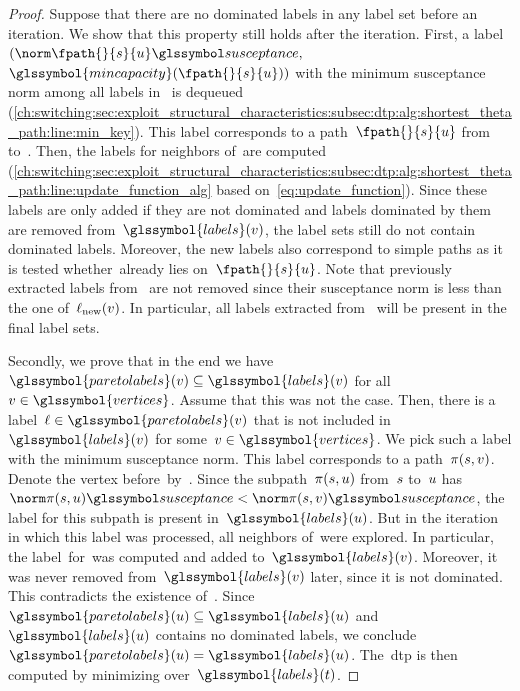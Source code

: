 \begin{proof}
    Suppose that there are no dominated labels in any label set before an iteration.
    We show that this property still holds after the iteration.
    First, a label~$(\bnorm{\fpath{}{\source}{\vertexa}},$ 
    $\glssymbol{mincapacity}(\fpath{}{\source}{\vertexa}))$ with the 
    minimum susceptance norm among all labels in~ is
    dequeued (\cref{ch:switching:sec:exploit_structural_characteristics:subsec:dtp:alg:shortest_theta_path:line:min_key}). This label
    corresponds to a path~$\fpath{}{\source}{\vertexa}$ from~\source 
    to~\vertexa. Then, the labels for neighbors of~\vertexa are computed
    (\cref{ch:switching:sec:exploit_structural_characteristics:subsec:dtp:alg:shortest_theta_path:line:update_function_alg} based
    on~\cref{eq:update_function}). Since these labels are only added if they are
    not dominated and labels dominated by them are removed
    from~$\glssymbol{labels}(\vertexb)$, the label sets still do not contain
    dominated labels. Moreover, the new labels also correspond to simple paths
    as it is tested whether~\vertex already lies
    on~$\fpath{}{\source}{\vertexa}$. Note that previously extracted labels
    from~ are not removed since their susceptance norm
    is less than the one of~$\mathrm{\ell}_\textrm{new}(v)$. In particular, all
    labels extracted from~ will be present in the final
    label sets.

    Secondly, we prove that in the end we have~$\glssymbol{paretolabels}
    (\vertexb)\subseteq\glssymbol{labels}(\vertexb)$ for
    all~$\vertexb\in\glssymbol{vertices}$. Assume that this was not the case.
    Then, there is a label~$\lab\in\glssymbol{paretolabels}(\vertexb)$ that is
    not included in~$\glssymbol{labels} (\vertexb)$ for
    some~$\vertexb\in\glssymbol{vertices}$. We pick such a label with the
    minimum susceptance norm. This label corresponds to a path~$\pi(s,
    v)$. Denote the vertex before~\vertexb by~\vertexa. 
    Since the subpath~$\pi(s, u)$ from~$s$ to~$u$ has~$
    \bnorm{\pathu(\source,\vertexa)} < \bnorm{\pathu(\source,\vertexb)}$, the 
    label for this subpath is present in~$\glssymbol{labels}(\vertexa)$. But in the
    iteration in which this label was processed, all neighbors of~\vertexa were
    explored. In particular, the label~\lab for~\vertexb was computed and added
    to~$\glssymbol{labels}(\vertexb)$. Moreover, it was never removed
    from~$\glssymbol{labels}(\vertexb)$ later, since it is not dominated. This
    contradicts the existence of~\lab.
    Since~$\glssymbol{paretolabels}(\vertexa)\subseteq\glssymbol{labels}(\vertexa)$
    and~$\glssymbol{labels}(\vertexa)$ contains no dominated labels, we
    conclude~$\glssymbol{paretolabels}(\vertexa)=\glssymbol{labels}(\vertexa)$.
    The~\gls{dtp} is then computed by minimizing
    over~$\glssymbol{labels}(\sink)$.
\end{proof}
